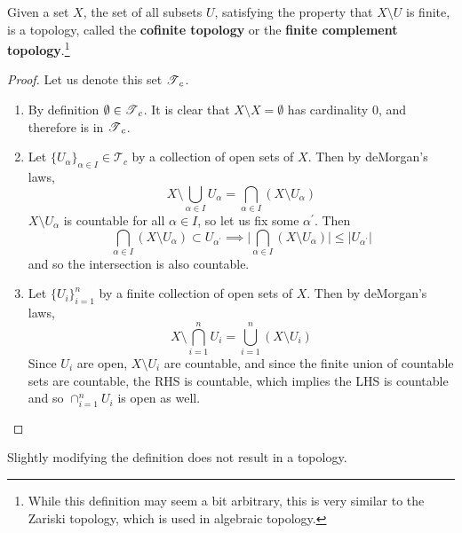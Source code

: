   \begin{definition}
    Given a set $X$, the set of all subsets $U$, satisfying the property that $X \setminus U$ is finite, is a topology, called the \textbf{cofinite topology} or the \textbf{finite complement topology}.\footnote{While this definition may seem a bit arbitrary, this is very similar to the Zariski topology, which is used in algebraic topology.} 
  \end{definition}
  \begin{proof}
    Let us denote this set $\T_c$. 
    \begin{enumerate}
      \item By definition $\emptyset \in \T_c$. It is clear that $X \setminus X = \emptyset$ has cardinality $0$, and therefore is in $\T_c$. 

      \item Let $\{U_\alpha\}_{\alpha \in I} \in \mathcal{T}_c$ by a collection of open sets of $X$. Then by deMorgan's laws, 
      \begin{equation}
        X \setminus \bigcup_{\alpha \in I} U_{\alpha} = \bigcap_{\alpha \in I} (X \setminus U_\alpha)
      \end{equation}
      $X \setminus U_\alpha$ is countable for all $\alpha \in I$, so let us fix some $\alpha^\prime$. Then 
      \begin{equation}
        \bigcap_{\alpha \in I} (X \setminus U_\alpha) \subset U_{\alpha^\prime} \implies \bigg| \bigcap_{\alpha \in I} (X \setminus U_\alpha) \bigg| \leq \big| U_{\alpha^\prime} \big| 
      \end{equation}
      and so the intersection is also countable. 

      \item Let $\{U_i\}_{i=1}^n$ by a finite collection of open sets of $X$. Then by deMorgan's laws, 
      \begin{equation}
        X \setminus \bigcap_{i=1}^n U_i = \bigcup_{i=1}^n (X \setminus U_i)
      \end{equation}
      Since $U_i$ are open, $X \setminus U_i$ are countable, and since the finite union of countable sets are countable, the RHS is countable, which implies the LHS is countable and so $\cap_{i=1}^n U_i$ is open as well. 
    \end{enumerate}
  \end{proof} 

  Slightly modifying the definition does not result in a topology. 

